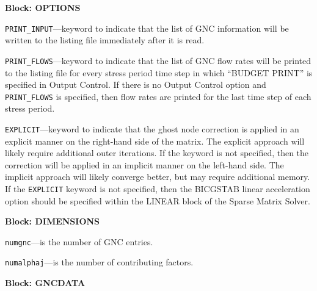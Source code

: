 
\item \textbf{Block: OPTIONS}

\begin{description}
\item \texttt{PRINT\_INPUT}---keyword to indicate that the list of GNC information will be written to the listing file immediately after it is read.

\item \texttt{PRINT\_FLOWS}---keyword to indicate that the list of GNC flow rates will be printed to the listing file for every stress period time step in which ``BUDGET PRINT'' is specified in Output Control.  If there is no Output Control option and \texttt{PRINT\_FLOWS} is specified, then flow rates are printed for the last time step of each stress period.

\item \texttt{EXPLICIT}---keyword to indicate that the ghost node correction is applied in an explicit manner on the right-hand side of the matrix.  The explicit approach will likely require additional outer iterations.  If the keyword is not specified, then the correction will be applied in an implicit manner on the left-hand side.  The implicit approach will likely converge better, but may require additional memory.  If the \texttt{EXPLICIT} keyword is not specified, then the BICGSTAB linear acceleration option should be specified within the LINEAR block of the Sparse Matrix Solver.

\end{description}
\item \textbf{Block: DIMENSIONS}

\begin{description}
\item \texttt{numgnc}---is the number of GNC entries.

\item \texttt{numalphaj}---is the number of contributing factors.

\end{description}
\item \textbf{Block: GNCDATA}

